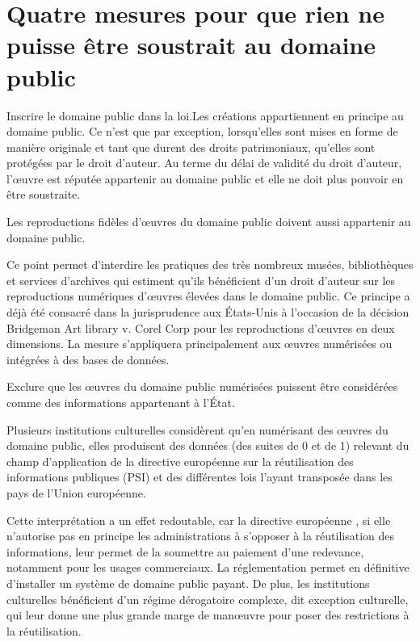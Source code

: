 \section{Quatre mesures pour que rien ne puisse être soustrait au domaine public}
\begin{mesure}
Inscrire le domaine public dans la loi.Les créations appartiennent en principe au domaine public. Ce n'est que par exception, lorsqu'elles sont mises en forme de manière originale et tant que durent des droits patrimoniaux, qu'elles sont protégées par le droit d'auteur. Au terme du délai de validité du droit d’auteur, l’œuvre est réputée appartenir au domaine public et elle ne doit plus pouvoir en être soustraite.  
\end{mesure}

\begin{mesure}
Les reproductions fidèles d’œuvres du domaine public doivent aussi appartenir au domaine public.
\end{mesure}

Ce point permet d’interdire les pratiques des très nombreux musées, bibliothèques et services d’archives qui estiment qu’ils bénéficient d’un droit d’auteur sur les reproductions numériques d’œuvres élevées dans le domaine public. Ce principe a déjà été consacré dans la jurisprudence aux États-Unis à l’occasion de la décision Bridgeman Art library v. Corel Corp pour les reproductions d'œuvres en deux dimensions. La mesure s’appliquera principalement aux œuvres numérisées ou intégrées à des bases de données.

\begin{mesure}
Exclure que les œuvres du domaine public numérisées puissent être considérées comme des informations appartenant à l'État.
\end{mesure}

Plusieurs institutions culturelles considèrent qu’en numérisant des œuvres du domaine public, elles produisent des données (des suites de 0 et de 1) relevant du champ d’application de la directive européenne sur la réutilisation des informations publiques (PSI) et des différentes lois l'ayant transposée dans les pays de l'Union européenne.

Cette interprétation a un effet redoutable, car la directive européenne , si elle n’autorise pas en principe les administrations à s’opposer à la réutilisation des informations, leur permet de la soumettre au paiement d’une redevance, notamment pour les usages commerciaux. La réglementation permet en définitive d’installer un système de domaine public payant. De plus, les institutions culturelles bénéficient d’un régime dérogatoire complexe, dit exception culturelle, qui leur donne une plus grande marge de manœuvre pour poser des restrictions à la réutilisation.

